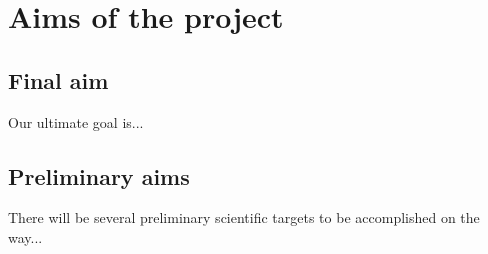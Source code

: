 
\chapter{Aims of the project}



\section{Final aim}

Our ultimate goal is...

\section{Preliminary aims}

There will be several preliminary scientific targets to be accomplished on the way...




